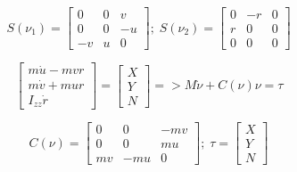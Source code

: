 \begin{equation*}
S(\nu_1) = \begin{bmatrix}
0 & 0 & v \\
0 & 0 & -u \\
-v & u & 0
\end{bmatrix};\; S(\nu_2) = \begin{bmatrix}
0 & -r & 0 \\
r & 0 & 0 \\
0 & 0 & 0
\end{bmatrix}
\end{equation*}

\noindent{\rule{4cm}{0.4pt}}

\begin{equation*}
\begin{bmatrix}
m\Dot{u} - mvr \\
m\Dot{v} + mur \\
I_{zz}\Dot{r}
\end{bmatrix} = \begin{bmatrix}
X \\
Y \\
N
\end{bmatrix} => M\Dot{\nu} + C(\nu)\nu = \tau
\end{equation*}

\begin{equation*}
C(\nu) = \begin{bmatrix}
0 & 0 & -mv \\
0 & 0 & mu \\
mv & -mu & 0
\end{bmatrix};\; \tau = \begin{bmatrix}
X \\
Y \\
N
\end{bmatrix}
\end{equation*}

